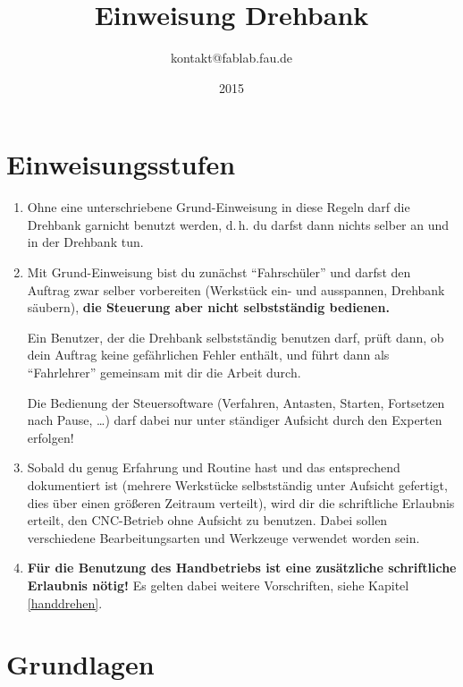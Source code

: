 \documentclass{\basedir/fablab-document}
\date{2015}
\author{kontakt@fablab.fau.de}
\title{Einweisung Drehbank}
\begin{document}
\listoftodos \newpage %

\tableofcontents

\newpage



\section{Einweisungsstufen}


\begin{enumerate}
 \item Ohne eine unterschriebene Grund-Einweisung in diese Regeln darf die Drehbank garnicht benutzt werden, d.\,h. du darfst dann nichts selber an und in der Drehbank tun.
 \item Mit Grund-Einweisung bist du zunächst \enquote{Fahrschüler} und darfst den Auftrag zwar selber vorbereiten (Werkstück ein- und ausspannen, Drehbank säubern), \textbf{die Steuerung aber nicht selbstständig bedienen.} 

       Ein Benutzer, der die Drehbank selbstständig benutzen darf, prüft dann, ob dein Auftrag keine gefährlichen Fehler enthält, und führt dann als \enquote{Fahrlehrer} gemeinsam mit dir die Arbeit durch.

 Die Bedienung der Steuersoftware (Verfahren, Antasten, Starten, Fortsetzen nach Pause, \dots) darf dabei nur unter ständiger Aufsicht durch den Experten erfolgen!
 \item Sobald du genug Erfahrung und Routine hast und das entsprechend dokumentiert ist (mehrere Werkstücke selbstständig unter Aufsicht gefertigt, dies über einen größeren Zeitraum verteilt), wird dir die schriftliche Erlaubnis erteilt, den CNC-Betrieb ohne Aufsicht zu benutzen. Dabei sollen verschiedene Bearbeitungsarten und Werkzeuge verwendet worden sein.
 \item  \textbf{Für die Benutzung des Handbetriebs ist eine zusätzliche schriftliche Erlaubnis nötig!} Es gelten dabei weitere Vorschriften, siehe Kapitel \ref{handdrehen}.
\end{enumerate}


\newpage
\section{Grundlagen}
\end{document}
